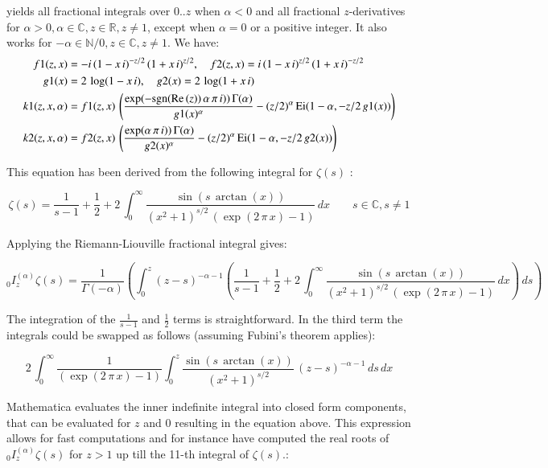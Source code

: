\documentclass[a4paper,11pt,twoside]{amsart}
\newcommand\Ei{\mathrm{Ei}}
\newcommand{\sgn}{\text{sgn}}
\renewcommand\Re{{\operatorname{Re\,}}}
\begin{document}
yields all fractional integrals over $0..z$ when $\alpha < 0$ and all fractional $z$-derivatives for $\alpha > 0, \alpha \in \mathbb{C}, z \in \mathbb{R}, z \ne 1$, except when $\alpha=0$ or a positive integer. It also works for $-\alpha \in \mathbb{N}/0, z \in \mathbb{C}, z \ne 1$. We have:
\begin{align}
f1(z,x) &= -i\,(1-x\,i)^{-z/2}\,(1+x\,i)^{z/2}, \quad f2(z,x) = i\,(1-x\,i)^{z/2}\,(1+x\,i)^{-z/2}\\
g1(x) &= 2\,\log(1-x\,i), \quad g2(x) = 2\,\log(1+x\,i)\\
k1(z,x,\alpha) &= f1(z,x)\,\left(\frac{\exp(-\sgn(\Re(z))\,\alpha\,\pi\,i))\,\Gamma(\alpha)}{g1(x)^{\alpha}} -(z/2)^{\alpha}\,\Ei(1-\alpha, -z/2\,g1(x)) \right)\\
k2(z,x,\alpha) &= f2(z,x)\,\left(\frac{\exp(\alpha\,\pi\,i))\,\Gamma(\alpha)}{g2(x)^{\alpha}} -(z/2)^{\alpha}\,\Ei(1-\alpha, -z/2\,g2(x)) \right)
\notag
\end{align}

This equation has been derived from the following integral for $\zeta(s)$ \cite{zeti}:

\begin{equation}\label{zetfrac2}
  \zeta(s) = \frac{1}{s-1}+\frac12+2\,\int_0^{\infty} \frac{\sin(s\,\arctan(x))}{(x^2+1)^{s/2}\,(\exp(2\,\pi\,x)-1)} \,dx \qquad s \in \mathbb{C}, s \ne 1
\end{equation}

Applying the Riemann-Liouville fractional integral gives:

\begin{equation}\label{zetfrac3}
  {}_0 I_z^{(\alpha)} \zeta(s) =\frac{1}{\Gamma(-\alpha)} \left( \int_0^z (z-s)^{-\alpha-1} \left( \frac{1}{s-1}+\frac12+2\,\int_0^{\infty} \frac{\sin(s\,\arctan(x))}{(x^2+1)^{s/2}\,(\exp(2\,\pi\,x)-1)} \,dx \right) \, ds \right)
\end{equation}

The integration of the $\frac{1}{s-1}$ and $\frac12$ terms is straightforward. In the third term the integrals could be swapped as follows (assuming Fubini's theorem applies):

\begin{equation}\label{zetfrac4}
 2\,\int_0^{\infty} \frac{1}{(\exp(2\,\pi\,x)-1)} \int_0^z \frac{\sin(s\,\arctan(x))}{(x^2+1)^{s/2}}\,(z-s)^{-\alpha-1} \,ds \, dx
\end{equation}


Mathematica\texttrademark{} evaluates the inner indefinite integral into closed form components, that can be evaluated for $z$ and $0$ resulting in the equation above. This expression allows for fast computations and for instance have computed the real roots of ${}_0 I_z^{(\alpha)} \zeta(s)$ for $z > 1$ up till the 11-th integral of $\zeta(s)$.:
\end{document}

